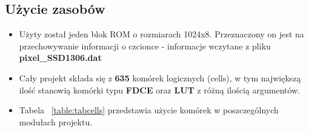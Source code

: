 \documentclass[12pt] {article}
\begin{document}
\subsection{Użycie zasobów}
\begin{itemize}
\item Użyty został jeden blok ROM o rozmiarach 1024x8. Przeznaczony on jest na przechowywanie informacji o czcionce - informacje wczytane z pliku \textbf{pixel\_SSD1306.dat}
\item Cały projekt składa się z \textbf{635} komórek logicznych (cells), w tym największą ilość stanowią komórki typu \textbf{FDCE} oraz \textbf{LUT} z różną ilością argumentów.
\item Tabela ~\ref{table:tabcells} przedstawia użycie komórek w poszczególnych modułach projektu.
\end{itemize}
\end{document}
